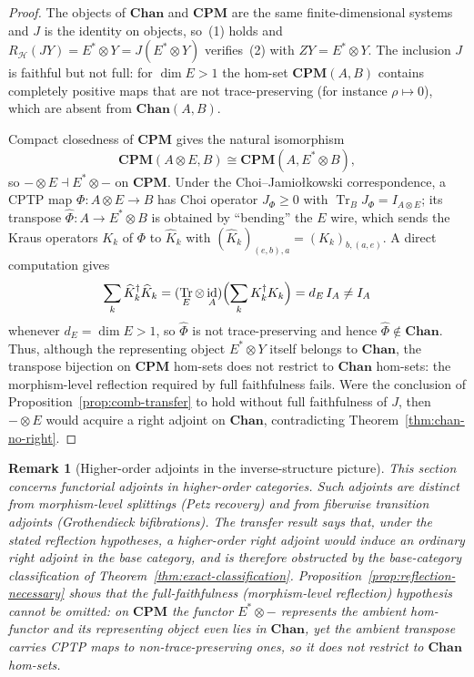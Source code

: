 \documentclass[11pt]{article}
\newtheorem{remark}[theorem]{Remark}
\DeclareMathOperator{\Tr}{Tr}
\DeclareMathOperator{\id}{id}
\begin{document}
\begin{proof}
The objects of $\mathbf{Chan}$ and $\mathbf{CPM}$ are the same
finite-dimensional systems and $J$ is the identity on objects, so~(1) holds and
$R_{\mathcal H}(JY)=E^{*}\otimes Y=J(E^{*}\otimes Y)$ verifies~(2) with
$ZY=E^{*}\otimes Y$. The inclusion $J$ is faithful but not full: for
$\dim E>1$ the hom-set $\mathbf{CPM}(A,B)$ contains completely positive maps
that are not trace-preserving (for instance $\rho\mapsto0$), which are absent
from $\mathbf{Chan}(A,B)$.

Compact closedness of $\mathbf{CPM}$ gives the natural isomorphism
\[
\mathbf{CPM}(A\otimes E,B)\cong\mathbf{CPM}(A,E^{*}\otimes B),
\]
so $-\otimes E\dashv E^{*}\otimes-$ on $\mathbf{CPM}$. Under the
Choi--Jamio\l{}kowski correspondence, a CPTP map $\Phi:A\otimes E\to B$ has
Choi operator $J_\Phi\ge0$ with $\Tr_B J_\Phi=I_{A\otimes E}$; its transpose
$\widehat\Phi:A\to E^{*}\otimes B$ is obtained by ``bending'' the $E$ wire,
which sends the Kraus operators $K_k$ of $\Phi$ to
$\widehat K_k$ with $(\widehat K_k)_{(e,b),a}=(K_k)_{b,(a,e)}$. A direct
computation gives
\[
\sum_k\widehat K_k^{\dagger}\widehat K_k
=
(\Tr_E\otimes\id_A)\Bigl(\sum_k K_k^{\dagger}K_k\Bigr)
=
d_E\,I_A
\neq
I_A
\]
whenever $d_E=\dim E>1$, so $\widehat\Phi$ is not trace-preserving and hence
$\widehat\Phi\notin\mathbf{Chan}$. Thus, although the representing object
$E^{*}\otimes Y$ itself belongs to $\mathbf{Chan}$, the transpose bijection on
$\mathbf{CPM}$ hom-sets does not restrict to $\mathbf{Chan}$ hom-sets: the
morphism-level reflection required by full faithfulness fails. Were the
conclusion of Proposition~\ref{prop:comb-transfer} to hold without full
faithfulness of $J$, then $-\otimes E$ would acquire a right adjoint on
$\mathbf{Chan}$, contradicting Theorem~\ref{thm:chan-no-right}.
\end{proof}

\begin{remark}[Higher-order adjoints in the inverse-structure picture]
This section concerns functorial adjoints in higher-order categories. Such
adjoints are distinct from morphism-level splittings (Petz recovery) and
from fiberwise transition adjoints (Grothendieck bifibrations). The transfer
result says that, under the stated reflection hypotheses, a higher-order
right adjoint would induce an ordinary right adjoint in the base category,
and is therefore obstructed by the base-category classification of
Theorem~\ref{thm:exact-classification}. Proposition~\ref{prop:reflection-necessary}
shows that the full-faithfulness (morphism-level reflection) hypothesis cannot
be omitted: on $\mathbf{CPM}$ the functor $E^{*}\otimes-$ represents the ambient
hom-functor and its representing object even lies in $\mathbf{Chan}$, yet the
ambient transpose carries CPTP maps to non-trace-preserving ones, so it does not
restrict to $\mathbf{Chan}$ hom-sets.
\end{remark}
\end{document}
